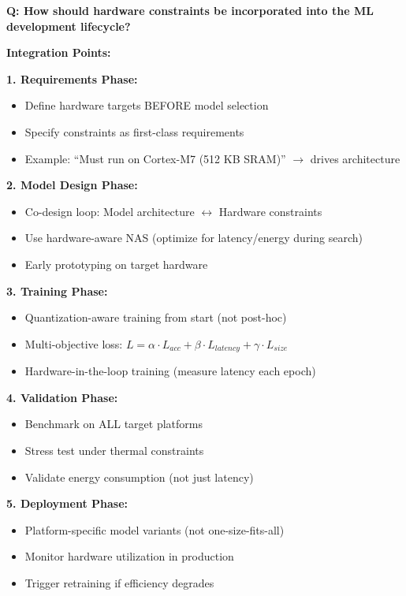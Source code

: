 \documentclass[10pt, a4paper]{article}
\begin{document}
\textbf{Q: How should hardware constraints be incorporated into the ML development lifecycle?}

\textbf{Integration Points:}

\textbf{1. Requirements Phase:}
\begin{itemize}
    \item Define hardware targets BEFORE model selection
    \item Specify constraints as first-class requirements
    \item Example: ``Must run on Cortex-M7 (512 KB SRAM)'' $\rightarrow$ drives architecture
\end{itemize}

\textbf{2. Model Design Phase:}
\begin{itemize}
    \item Co-design loop: Model architecture $\leftrightarrow$ Hardware constraints
    \item Use hardware-aware NAS (optimize for latency/energy during search)
    \item Early prototyping on target hardware
\end{itemize}

\textbf{3. Training Phase:}
\begin{itemize}
    \item Quantization-aware training from start (not post-hoc)
    \item Multi-objective loss: $L = \alpha \cdot L_{acc} + \beta \cdot L_{latency} + \gamma \cdot L_{size}$
    \item Hardware-in-the-loop training (measure latency each epoch)
\end{itemize}

\textbf{4. Validation Phase:}
\begin{itemize}
    \item Benchmark on ALL target platforms
    \item Stress test under thermal constraints
    \item Validate energy consumption (not just latency)
\end{itemize}

\textbf{5. Deployment Phase:}
\begin{itemize}
    \item Platform-specific model variants (not one-size-fits-all)
    \item Monitor hardware utilization in production
    \item Trigger retraining if efficiency degrades
\end{itemize}
\end{document}
